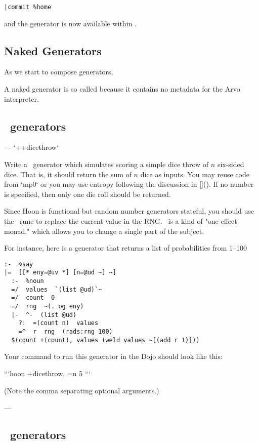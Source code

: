 \begin{lstlisting}[style=nonumbers]
|commit %home
\end{lstlisting}

and the generator is now available within \clay.

\subsection{Naked Generators}

As we start to compose generators,

A naked generator is so called because it contains no metadata for the Arvo interpreter.

\subsection{\say~generators}


---
`++dicethrow`

Write a \say~generator which simulates scoring a simple dice throw of $n$ six-sided dice.  That is, it should return the sum of $n$ dice as inputs.  You may reuse code from `mp0` or you may use entropy following the discussion in []().  If no number is specified, then only one die roll should be returned.

Since Hoon is functional but random number generators stateful, you should use the \ptisket~rune to replace the current value in the RNG.  \tisket~is a kind of "one-effect monad," which allows you to change a single part of the subject.

For instance, here is a generator that returns a list of probabilities from 1–100%

\begin{lstlisting}
:-  %say
|=  [[* eny=@uv *] [n=@ud ~] ~]
  :-  %noun
  =/  values  `(list @ud)`~
  =/  count  0
  =/  rng  ~(. og eny)
  |-  ^-  (list @ud)
    ?:  =(count n)  values
    =^  r  rng  (rads:rng 100)
  $(count +(count), values (weld values ~[(add r 1)]))
\end{lstlisting}

Your command to run this generator in the Dojo should look like this:

```hoon
+dicethrow, =n 5
```

(Note the comma separating optional arguments.)

---

\subsection{\ask~generators}


